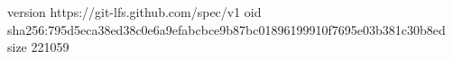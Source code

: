 version https://git-lfs.github.com/spec/v1
oid sha256:795d5eca38ed38c0e6a9efabcbce9b87bc01896199910f7695e03b381c30b8ed
size 221059
